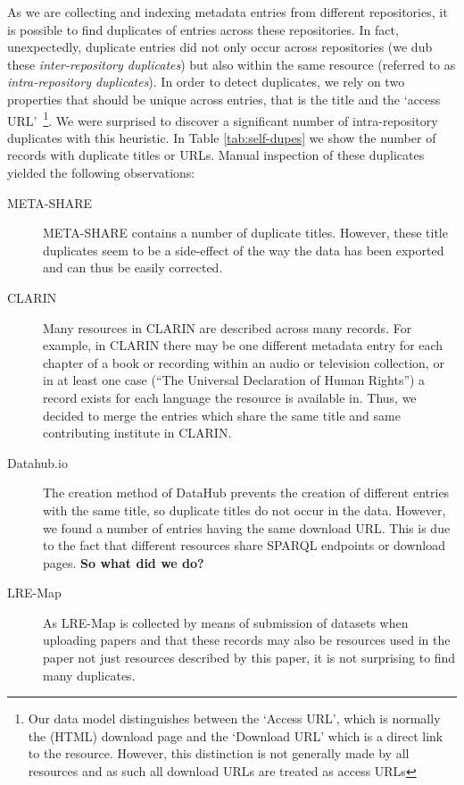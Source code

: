\documentclass[11pt]{article}
\begin{document}
As we are collecting and indexing metadata entries from different repositories, it is possible to find duplicates of entries across these repositories. 
In fact, unexpectedly, duplicate entries did not only occur across repositories (we dub these \emph{inter-repository duplicates}) but also within the same resource (referred to as \emph{intra-repository duplicates}). 
In order to detect duplicates, we rely on two properties
that should be unique across entries, that is the title and the `access URL'~\footnote{Our data model distinguishes
    between the `Access URL', which is normally the (HTML) download page and the
    `Download URL' which is a direct link to the resource. However, this
    distinction is not generally made by all resources and as such all
download URLs are treated as access URLs}. We were surprised 
to discover a significant number of intra-repository duplicates with this heuristic.
In Table
\ref{tab:self-dupes} we show the number of records with duplicate titles or URLs.
Manual inspection of these duplicates yielded the following
observations:

\begin{description}

	\item[META-SHARE] META-SHARE contains a number of duplicate titles. However, these title duplicates seem to be a side-effect of the way the data has been exported and can thus be easily corrected. 

    \item[CLARIN] Many resources in CLARIN are described across many records.
        For example, in CLARIN there may be one different metadata entry for each chapter of a book or
        recording within an audio or television collection, or in at least one case
        (``The Universal Declaration of Human Rights'') a record exists for each
        language the resource is available in. Thus, we decided to merge the entries which
        share the same title and same contributing institute in CLARIN.
        
    \item[Datahub.io] The creation method of DataHub prevents the creation of different entries with the same title, so duplicate titles do not occur in the data. However, we found a number of entries having the same download URL. This is due to the fact that different resources share SPARQL endpoints or download pages. \textbf{So what did we do?}
    
    \item[LRE-Map] As LRE-Map is collected by means of submission of datasets
        when uploading papers and that these records may also be resources used
        in the paper not just resources described by this paper, it is not
        surprising to find many duplicates. 
    
\end{description}
\end{document}
